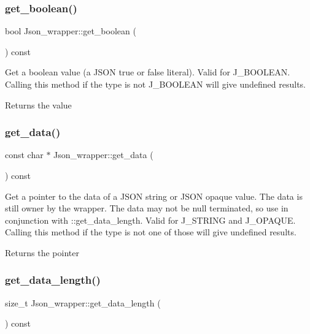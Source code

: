 \subsubsection{\texorpdfstring{get\+\_\+boolean()}{get\_boolean()}}
{\footnotesize\ttfamily bool Json\+\_\+wrapper\+::get\+\_\+boolean (\begin{DoxyParamCaption}{ }\end{DoxyParamCaption}) const}

Get a boolean value (a J\+S\+ON true or false literal). Valid for J\+\_\+\+B\+O\+O\+L\+E\+AN. Calling this method if the type is not J\+\_\+\+B\+O\+O\+L\+E\+AN will give undefined results.

\begin{DoxyReturn}{Returns}
the value 
\end{DoxyReturn}
\mbox{\label{classJson__wrapper_a017b37a8d667e42bf1686a6ef172a99f}} 
\subsubsection{\texorpdfstring{get\+\_\+data()}{get\_data()}}
{\footnotesize\ttfamily const char $\ast$ Json\+\_\+wrapper\+::get\+\_\+data (\begin{DoxyParamCaption}{ }\end{DoxyParamCaption}) const}

Get a pointer to the data of a J\+S\+ON string or J\+S\+ON opaque value. The data is still owner by the wrapper. The data may not be null terminated, so use in conjunction with \+::get\+\_\+data\+\_\+length. Valid for J\+\_\+\+S\+T\+R\+I\+NG and J\+\_\+\+O\+P\+A\+Q\+UE. Calling this method if the type is not one of those will give undefined results.

\begin{DoxyReturn}{Returns}
the pointer 
\end{DoxyReturn}
\mbox{\label{classJson__wrapper_a33f0cd3c6c3ecf1336b0f76a4dae65b2}} 
\subsubsection{\texorpdfstring{get\+\_\+data\+\_\+length()}{get\_data\_length()}}
{\footnotesize\ttfamily size\+\_\+t Json\+\_\+wrapper\+::get\+\_\+data\+\_\+length (\begin{DoxyParamCaption}{ }\end{DoxyParamCaption}) const}

